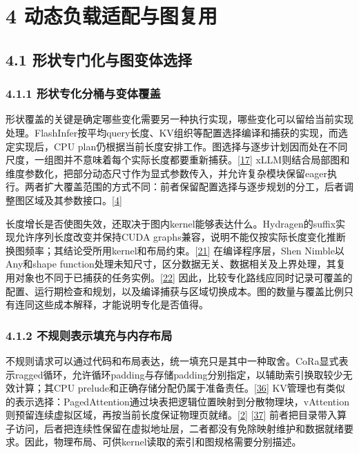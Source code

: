 \documentclass[
  11pt,
  UTF8]{ctexart}
\begin{document}
\hypertarget{section-4}{%
\section{4 动态负载适配与图复用}\label{section-4}}

\hypertarget{section-4-1}{%
\subsection{4.1 形状专门化与图变体选择}\label{section-4-1}}

\hypertarget{section-4-1-1}{%
\subsubsection{4.1.1 形状专化分桶与变体覆盖}\label{section-4-1-1}}

形状覆盖的关键是确定哪些变化需要另一种执行实现，哪些变化可以留给当前实现处理。FlashInfer按平均query长度、KV组织等配置选择编译和捕获的实现，而选定实现后，CPU
plan仍根据当前长度安排工作。图选择与逐步计划因而处在不同尺度，一组图并不意味着每个实际长度都要重新捕获。{[}\protect\hyperlink{ref-ye2025flashinfer}{17}{]}
xLLM则结合局部图和维度参数化，把部分动态尺寸作为显式参数传入，并允许复杂模块保留eager执行。两者扩大覆盖范围的方式不同：前者保留配置选择与逐步规划的分工，后者调整图区域及其参数接口。{[}\protect\hyperlink{ref-liu2025xllm}{4}{]}

长度增长是否使图失效，还取决于图内kernel能够表达什么。Hydragen的suffix实现允许序列长度改变并保持CUDA
graphs兼容，说明不能仅按实际长度变化推断换图频率；其结论受所用kernel和布局约束。{[}\protect\hyperlink{ref-juravsky2024hydragen}{21}{]}
在编译程序层，Shen Nimble以Any和shape
function处理未知尺寸，区分数据无关、数据相关及上界处理，其复用对象也不同于已捕获的任务实例。{[}\protect\hyperlink{ref-shen2021nimble}{22}{]}
因此，比较专化路线应同时记录可覆盖的配置、运行期检查和规划，以及编译捕获与区域切换成本。图的数量与覆盖比例只有连同这些成本解释，才能说明专化是否值得。

\hypertarget{section-4-1-2}{%
\subsubsection{4.1.2 不规则表示填充与内存布局}\label{section-4-1-2}}

不规则请求可以通过代码和布局表达，统一填充只是其中一种取舍。CoRa显式表示ragged循环，允许循环padding与存储padding分别指定，以辅助索引换取较少无效计算；其CPU
prelude和正确存储分配仍属于准备责任。{[}\protect\hyperlink{ref-fegade2022cora}{36}{]}
KV管理也有类似的表示选择：PagedAttention通过块表把逻辑位置映射到分散物理块，vAttention则预留连续虚拟区域，再按当前长度保证物理页就绪。{[}\protect\hyperlink{ref-kwon2023vllm}{2}{]}
{[}\protect\hyperlink{ref-prabhu2025vattention}{37}{]}
前者把目录带入算子访问，后者把连续性保留在虚拟地址层，二者都没有免除映射维护和数据就绪要求。因此，物理布局、可供kernel读取的索引和图规格需要分别描述。
\end{document}
